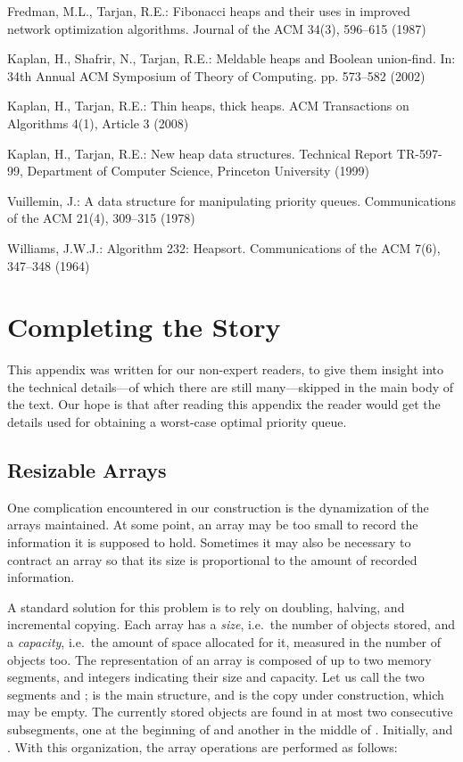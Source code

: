 \documentclass{llncs}
\begin{document}
\begin{thebibliography}{10}
Fredman, M.L., Tarjan, R.E.: Fibonacci heaps and their uses in improved network
  optimization algorithms. Journal of the ACM  34(3),  596--615 (1987)

Kaplan, H., Shafrir, N., Tarjan, R.E.: Meldable heaps and {B}oolean union-find.
  In: 34th Annual ACM Symposium of Theory of Computing. pp. 573--582 (2002)

Kaplan, H., Tarjan, R.E.: Thin heaps, thick heaps. ACM Transactions on
  Algorithms  4(1),  Article 3 (2008)

Kaplan, H., Tarjan, R.E.: New heap data structures. Technical Report TR-597-99,
  Department of Computer Science, Princeton University (1999)

Vuillemin, J.: A data structure for manipulating priority queues.
  Communications of the ACM  21(4),  309--315 (1978)

Williams, J.W.J.: Algorithm 232: {H}eapsort. Communications of the ACM  7(6),
  347--348 (1964)


\end{thebibliography}


\newpage
\appendix
\section{Completing the Story}

This appendix was written for our non-expert readers, to give them
insight into the technical details---of which there are still
many---skipped in the main body of the text.  Our hope is that after
reading this appendix the reader would get the details 
used for obtaining a worst-case optimal priority queue.

\subsection{Resizable Arrays}

One complication encountered in our construction is the dynamization
of the arrays maintained. At some point, an array may be too small to
record the information it is supposed to hold. Sometimes it may also
be necessary to contract an array so that its size is proportional to
the amount of recorded information.

A standard solution for this problem is to rely on doubling, halving,
and incremental copying. Each array has a \emph{size}, i.e.~the number
of objects stored, and a \emph{capacity}, i.e.~the amount of space
allocated for it, measured in the number of objects too. The
representation of an array is composed of up to two memory segments, and
integers indicating their size and capacity. Let us call
the two segments  and ;  is the main structure, and  is the
copy under construction, which may be empty. The currently stored
objects are found in at most two consecutive subsegments, one at the
beginning of  and another in the middle of . Initially,
 and . With this organization,
the array operations are performed as follows:
\end{document}
